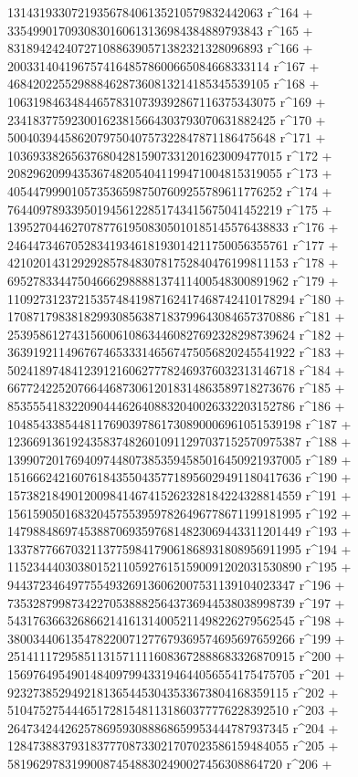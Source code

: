        1314319330721935678406135210579832442063 r^164 + 
       3354990170930830160613136984384889793843 r^165 + 
       8318942424072710886390571382321328096893 r^166 + 
       20033140419675741648578600665084668333114 r^167 + 
       46842022552988846287360813214185345539105 r^168 + 
       106319846348446578310739392867116375343075 r^169 + 
       234183775923001623815664303793070631882425 r^170 + 
       500403944586207975040757322847871186475648 r^171 + 
       1036933826563768042815907331201623009477015 r^172 + 
       2082962099435367482054041199471004815319055 r^173 + 
       4054479990105735365987507609255789611776252 r^174 + 
       7644097893395019456122851743415675041452219 r^175 + 
       13952704462707877619508305010185145576438833 r^176 + 
       24644734670528341934618193014211750056355761 r^177 + 
       42102014312929285784830781752840476199811153 r^178 + 
       69527833447504666298888137411400548300891962 r^179 + 
       110927312372153574841987162417468742410178294 r^180 + 
       170871798381829930856387183799643084657370886 r^181 + 
       253958612743156006108634460827692328298739624 r^182 + 
       363919211496767465333146567475056820245541922 r^183 + 
       502418974841239121606277782469376032313146718 r^184 + 
       667724225207664468730612018314863589718273676 r^185 + 
       853555418322090444626408832040026332203152786 r^186 + 
       1048543385448117690397861730890006961051539198 r^187 + 
       1236691361924358374826010911297037152570975387 r^188 + 
       1399072017694097448073853594585016450921937005 r^189 + 
       1516662421607618435504357718956029491180417636 r^190 + 
       1573821849012009841467415262328184224328814559 r^191 + 
       1561590501683204575539597826496778671199181995 r^192 + 
       1479884869745388706935976814823069443311201449 r^193 + 
       1337877667032113775984179061868931808956911995 r^194 + 
       1152344403038015211059276151590091202031530890 r^195 + 
       944372346497755493269136062007531139104023347 r^196 + 
       735328799873422705388825643736944538038998739 r^197 + 
       543176366326866214161314005211498226279562545 r^198 + 
       380034406135478220071277679369574695697659266 r^199 + 
       251411172958511315711116083672888683326870915 r^200 + 
       156976495490148409799433194644056554175475705 r^201 + 
       92327385294921813654453043533673804168359115 r^202 + 
       51047527544465172815481131860377776228392510 r^203 + 
       26473424426257869593088868659953444787937345 r^204 + 
       12847388379318377708733021707023586159484055 r^205 + 
       5819629783199008745488302490027456308864720 r^206 + 
